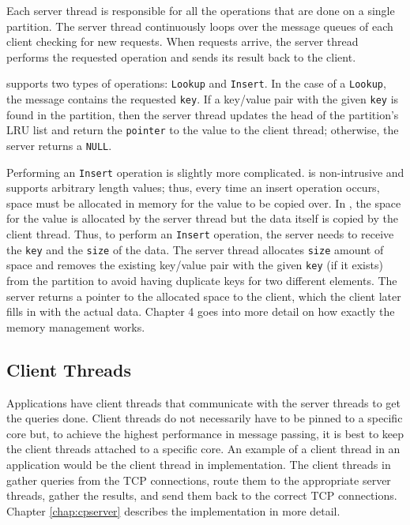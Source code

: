 Each server thread is responsible for all the operations that are done on a single partition. 
The server thread continuously loops over the message queues of each client checking for new requests. When requests arrive, the 
server thread performs the requested operation and sends its result back to the client. 

\cphash{} supports two types of operations: \texttt{Lookup} and \texttt{Insert}. 
In the case of a \texttt{Lookup}, the message contains the requested \texttt{key}. If a key/value pair with the given 
\texttt{key} is found in the partition, then the server thread updates the head of the partition's LRU list and return the \texttt{pointer} to the 
value to the client thread; otherwise, the server returns a \texttt{NULL}.

Performing an \texttt{Insert} operation is slightly more complicated. \cphash{} is non-intrusive and 
supports arbitrary length values; thus, every time an insert operation occurs, space must be allocated 
in memory for the value to be copied over. In \cphash{}, the space for the value is allocated by the server 
thread but the data itself is copied by the client thread. Thus, to perform an \texttt{Insert} operation, the server needs 
to receive the \texttt{key} and the \texttt{size} of the data. The server thread allocates \texttt{size} amount of space and removes the existing 
key/value pair with the given \texttt{key} (if it exists) from the partition to avoid having duplicate keys for two different 
elements. The server returns a pointer to the allocated space to the client, which the client later fills in with the
actual data. Chapter 4 goes into more detail on how exactly the memory management works. 
  
\subsection{Client Threads}
\label{sec:clientthreads}

Applications have client threads that communicate with the server threads to get the queries done. 
Client threads do not necessarily have to be pinned to a specific core but, to achieve the highest performance 
in message passing, it is best to keep the client threads attached to a specific core. An example of a client 
thread in an application would be the client thread in \cpserver{} implementation. The client threads in \cpserver{} 
gather queries from the TCP connections, route them to the appropriate server threads, gather the results, and 
send them back to the correct TCP connections. Chapter \ref{chap:cpserver} describes the \cpserver{} implementation
in more detail.

